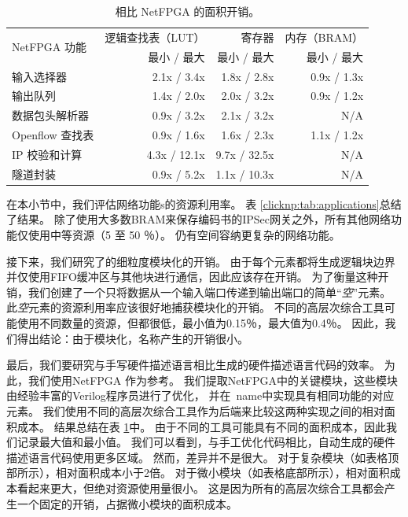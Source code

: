 \begin{table}[htbp]
	\centering
	
	\caption{相比 NetFPGA 的面积开销。}
	\label{clicknp:tab:netfpga}
	\begin{tabular}{l|r|r|r}
		\toprule
		\multirow{2}{2.2cm}{NetFPGA 功能} & 逻辑查找表（LUT） & 寄存器 & 内存（BRAM） \\
		& 最小 / 最大 & 最小 / 最大 & 最小 / 最大 \\
		\midrule
		输入选择器  & 2.1x / 3.4x & 1.8x / 2.8x & 0.9x / 1.3x \\
		输出队列   & 1.4x / 2.0x & 2.0x / 3.2x & 0.9x / 1.2x \\
		数据包头解析器  & 0.9x / 3.2x & 2.1x / 3.2x & N/A \\
		Openflow 查找表 & 0.9x / 1.6x & 1.6x / 2.3x & 1.1x / 1.2x \\
		\midrule
		\midrule
		IP 校验和计算    & 4.3x / 12.1x & 9.7x / 32.5x & N/A \\
		隧道封装          & 0.9x / 5.2x & 1.1x / 10.3x & N/A \\
		\bottomrule
	\end{tabular}
	
\end{table}


在本小节中，我们评估\name 网络功能s的资源利用率。
表 \ref {clicknp:tab:applications}总结了结果。
除了使用大多数BRAM来保存编码书的IPSec网关之外，所有其他网络功能仅使用中等资源（5 至 50 ％）。
仍有空间容纳更复杂的网络功能。

接下来，我们研究了\name 的细粒度模块化的开销。
由于每个元素都将生成逻辑块边界并仅使用FIFO缓冲区与其他块进行通信，因此应该存在开销。
为了衡量这种开销，我们创建了一个只将数据从一个输入端口传递到输出端口的简单``\textit{空}''元素。
此\textit {空}元素的资源利用率应该很好地捕获模块化的开销。
不同的高层次综合工具可能使用不同数量的资源，但都很低，最小值为0.15％，最大值为0.4％。
因此，我们得出结论：由于模块化，名称产生的开销很小。

最后，我们要研究\name 与手写硬件描述语言相比生成的硬件描述语言代码的效率。
为此，我们使用NetFPGA \cite {netfpga}作为参考。
我们提取NetFPGA中的关键模块，这些模块由经验丰富的Verilog程序员进行了优化，
并在\ name中实现具有相同功能的对应元素。
我们使用不同的高层次综合工具作为后端来比较这两种实现之间的相对面积成本。
结果总结在表 \ref {clicknp:tab:netfpga}中。
由于不同的工具可能具有不同的面积成本，因此我们记录最大值和最小值。
我们可以看到，与手工优化代码相比，自动生成的硬件描述语言代码使用更多区域。
然而，差异并不是很大。
对于复杂模块（如表格顶部所示），相对面积成本小于2倍。
对于微小模块（如表格底部所示），相对面积成本看起来更大，但绝对资源使用量很小。
这是因为所有的高层次综合工具都会产生一个固定的开销，占据微小模块的面积成本。


